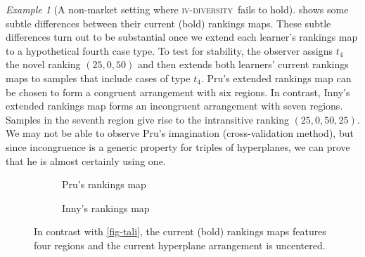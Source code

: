 \documentclass[ecta,nameyear,draft]{econsocart}
\newcommand{\fourdiv}{\textsc{iv}-\textsc{diversity}}
\newcommand{\threediv}{\textsc{iii}-\textsc{diversity}}
\theoremstyle{plain}
\theoremstyle{remark}
\newtheorem{example}{Example}%
\begin{document}
\begin{example}[A non-market setting where \fourdiv\ fails to hold]
   shows some subtle differences between their current (bold)
  rankings maps.  These subtle differences turn out to be substantial once we
  extend each learner's rankings map to a hypothetical fourth case type.  To
  test for stability, the observer assigns $t_4$ the novel ranking $\left({25},
  {0}, {50}\right)$ and then extends both learners' current rankings maps to
  samples that include cases of type $t_4$.  {Pru}'s extended rankings map can
  be chosen to form a congruent arrangement with six regions. In contrast,
  Inny's extended rankings map forms an incongruent arrangement with seven
  regions.  Samples in the seventh region give rise to the intransitive ranking
  $\left({25}, {0}, {50}, {25}\right)$.
  We may not be able to observe {Pru}'s imagination (cross-validation method),
  but since incongruence is a generic property for triples of hyperplanes, we
  can prove that he is almost certainly using one.
  \begin{figure}[ht] \centering
    \begin{subfigure}{.5\textwidth} \def \congruent{1} \centering
       \caption{\label{fig-rates-prati} {Pru}'s
      rankings map}
    \end{subfigure}%
    \begin{subfigure}{.5\textwidth} \def \congruent{0} \centering
       \caption{\label{fig-rates-sempi} Inny's
      rankings map}
    \end{subfigure}
    \caption{\label{fig-rates} In contrast with \cref{fig-tali}, the current
      (bold) rankings maps features four regions and the current hyperplane
    arrangement is uncentered. }
  \end{figure}
\end{example}
\end{document}

